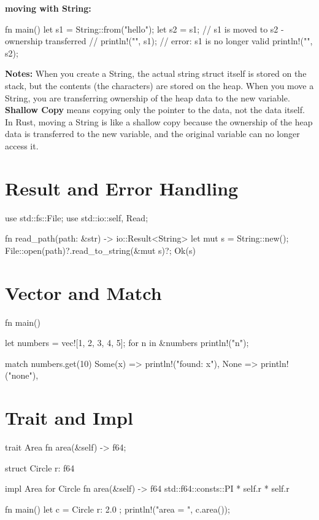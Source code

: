 \documentclass[8pt,a4paper,twocolumn]{extarticle}
\begin{document}
\textbf{moving with String:}
\begin{Code}
fn main() {
    let s1 = String::from("hello");
    let s2 = s1; // s1 is moved to s2 - ownership transferred
    // println!("{}", s1); // error: s1 is no longer valid
    println!("{}", s2);
}
\end{Code}

\textbf{Notes:} When you create a String, the actual string struct itself is stored on the stack, but the contents (the characters) are stored on the heap. When you move a String, you are transferring ownership of the heap data to the new variable.
\textbf{Shallow Copy} means copying only the pointer to the data, not the data itself. In Rust, moving a String is like a shallow copy because the ownership of the heap data is transferred to the new variable, and the original variable can no longer access it.

\section{Result and Error Handling}
\begin{Code}
use std::fs::File;
use std::io::{self, Read};

fn read_path(path: &str) -> io::Result<String> {
    let mut s = String::new();
    File::open(path)?.read_to_string(&mut s)?;
    Ok(s)
}
\end{Code}

\section{Vector and Match}
\begin{Code}
fn main() {
    let numbers = vec![1, 2, 3, 4, 5];
    for n in &numbers { println!("{n}"); }

    match numbers.get(10) {
        Some(x) => println!("found: {x}"),
        None => println!("none"),
    }
}
\end{Code}

\section{Trait and Impl}
\begin{Code}
trait Area { fn area(&self) -> f64; }

struct Circle { r: f64 }

impl Area for Circle {
    fn area(&self) -> f64 { std::f64::consts::PI * self.r * self.r }
}

fn main() {
    let c = Circle { r: 2.0 };
    println!("area = {}", c.area());
}
\end{Code}
\end{document}
